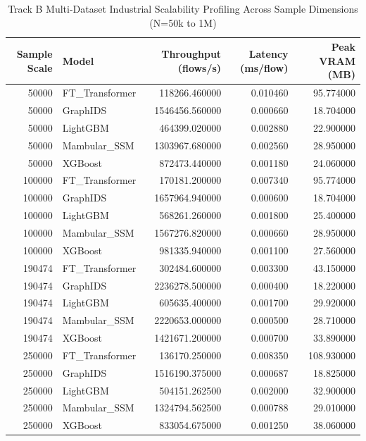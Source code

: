 \begin{table}[t]
\centering
\caption{Track B Multi-Dataset Industrial Scalability Profiling Across Sample Dimensions (N=50k to 1M)}
\label{tab:scalability_summary}
\small
\begin{tabular}{rlrrr}
\toprule
Sample Scale & Model & Throughput (flows/s) & Latency (ms/flow) & Peak VRAM (MB) \\
\midrule
50000 & FT_Transformer & 118266.460000 & 0.010460 & 95.774000 \\
50000 & GraphIDS & 1546456.560000 & 0.000660 & 18.704000 \\
50000 & LightGBM & 464399.020000 & 0.002880 & 22.900000 \\
50000 & Mambular_SSM & 1303967.680000 & 0.002560 & 28.950000 \\
50000 & XGBoost & 872473.440000 & 0.001180 & 24.060000 \\
100000 & FT_Transformer & 170181.200000 & 0.007340 & 95.774000 \\
100000 & GraphIDS & 1657964.940000 & 0.000600 & 18.704000 \\
100000 & LightGBM & 568261.260000 & 0.001800 & 25.400000 \\
100000 & Mambular_SSM & 1567276.820000 & 0.000660 & 28.950000 \\
100000 & XGBoost & 981335.940000 & 0.001100 & 27.560000 \\
190474 & FT_Transformer & 302484.600000 & 0.003300 & 43.150000 \\
190474 & GraphIDS & 2236278.500000 & 0.000400 & 18.220000 \\
190474 & LightGBM & 605635.400000 & 0.001700 & 29.920000 \\
190474 & Mambular_SSM & 2220653.000000 & 0.000500 & 28.710000 \\
190474 & XGBoost & 1421671.200000 & 0.000700 & 33.890000 \\
250000 & FT_Transformer & 136170.250000 & 0.008350 & 108.930000 \\
250000 & GraphIDS & 1516190.375000 & 0.000687 & 18.825000 \\
250000 & LightGBM & 504151.262500 & 0.002000 & 32.900000 \\
250000 & Mambular_SSM & 1324794.562500 & 0.000788 & 29.010000 \\
250000 & XGBoost & 833054.675000 & 0.001250 & 38.060000 \\
\bottomrule
\end{tabular}

\end{table}
